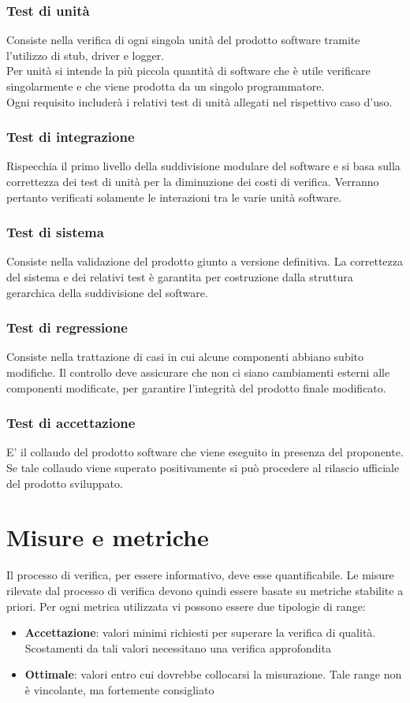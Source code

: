 \documentclass[12pt,a4paper]{article}
\begin{document}
\subsubsection{Test di unità}
Consiste nella verifica di ogni singola unità del prodotto software tramite l’utilizzo di stub, driver e logger.\\
Per unità si intende la più piccola quantità di software che è utile verificare singolarmente e che viene prodotta da un singolo programmatore.\\
Ogni requisito includerà i relativi test di unità allegati nel rispettivo caso d'uso.

\subsubsection{Test di integrazione}
Rispecchia il primo livello della suddivisione modulare del software e si basa sulla correttezza dei test di unità per la diminuzione dei costi di verifica. Verranno pertanto verificati solamente le interazioni tra le varie unità software.

\subsubsection{Test di sistema}
Consiste nella validazione del prodotto giunto a versione definitiva. La correttezza del sistema e dei relativi test è garantita per costruzione dalla struttura gerarchica della suddivisione del software.
\subsubsection{Test di regressione}
Consiste nella trattazione di casi in cui alcune componenti abbiano subito modifiche. Il controllo deve assicurare che non ci siano cambiamenti esterni alle componenti modificate, per garantire l'integrità del prodotto finale modificato.
\subsubsection{Test di accettazione}
E' il collaudo del prodotto software che viene eseguito in presenza del proponente. Se tale collaudo viene superato positivamente si può procedere al rilascio ufficiale del prodotto sviluppato. 

\section{Misure e metriche}\label{metriche}
Il processo di verifica, per essere informativo, deve esse quantificabile. Le misure rilevate dal processo di verifica devono quindi essere basate su metriche stabilite a priori. Per ogni metrica utilizzata vi possono essere due tipologie di range:
\begin{itemize}
\item \textbf{Accettazione}: valori minimi richiesti per superare la verifica di qualità. Scostamenti da tali valori necessitano una verifica approfondita
\item \textbf{Ottimale}: valori entro cui dovrebbe collocarsi la misurazione. Tale range non è vincolante, ma fortemente consigliato
\end{itemize}
\end{document}
